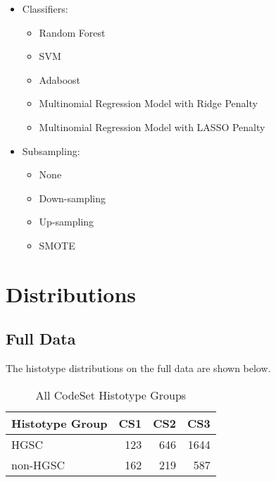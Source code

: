 \documentclass[
]{report}
\providecommand{\tightlist}{%
  \setlength{\itemsep}{0pt}\setlength{\parskip}{0pt}}
\begin{document}
\begin{itemize}
\item
  Classifiers:

  \begin{itemize}
  \tightlist
  \item
    Random Forest
  \item
    SVM
  \item
    Adaboost
  \item
    Multinomial Regression Model with Ridge Penalty
  \item
    Multinomial Regression Model with LASSO Penalty
  \end{itemize}
\item
  Subsampling:

  \begin{itemize}
  \tightlist
  \item
    None
  \item
    Down-sampling
  \item
    Up-sampling
  \item
    SMOTE
  \end{itemize}
\end{itemize}

\hypertarget{distributions}{%
\chapter{Distributions}\label{distributions}}

\hypertarget{full-data}{%
\section{Full Data}\label{full-data}}

The histotype distributions on the full data are shown below.

\begin{table}

\caption{\label{tab:dist-all-hist-gr}All CodeSet Histotype Groups}
\centering
\begin{tabular}[t]{l|r|r|r}
\hline
Histotype Group & CS1 & CS2 & CS3\\
\hline
HGSC & 123 & 646 & 1644\\
\hline
non-HGSC & 162 & 219 & 587\\
\hline
\end{tabular}
\end{table}
\end{document}
